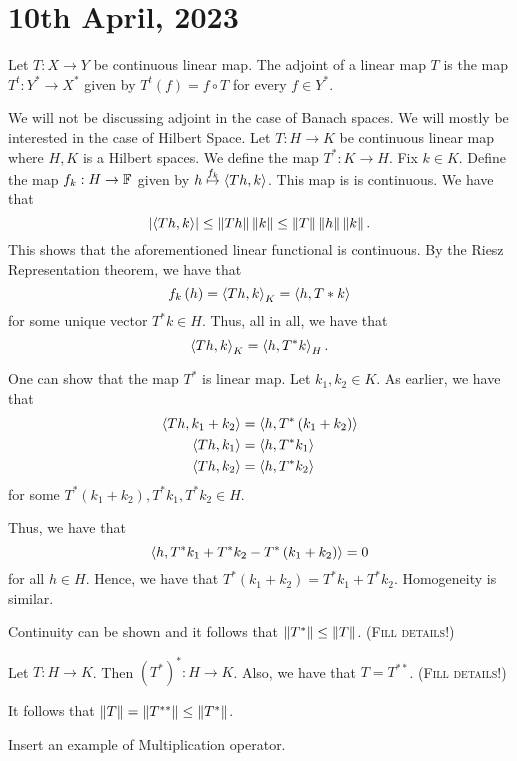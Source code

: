 \section{10th April, 2023}
\horz
Let $T: X\to Y$ be continuous linear map. The adjoint of a linear map $T$ is the map $T^{t} : Y^{*} \to X^{*}$ given by $T^{t} (f) = f \circ T$ for every $f \in Y^{*}$.

We will not be discussing adjoint in the case of Banach spaces. We will mostly be interested in the case of Hilbert Space. Let $T: H \to K$ be continuous linear map where $H, K$ is a Hilbert spaces. We define the map $T^{*} : K \to H$. Fix $k \in K$. Define the map $f_{k} : H \to \mathbb F$ given by $h \stackrel{f_{k}}{\mapsto} \left\langle Th, k \right\rangle$. This map is is continuous. We have that
\begin{equation*}
    \left\lvert \left\langle Th, k \right\rangle \right\rvert \le \left\lVert Th \right\rVert \left\lVert k \right\rVert \le \left\lVert T \right\rVert \left\lVert h \right\rVert \left\lVert k \right\rVert.
\end{equation*}
This shows that the aforementioned linear functional is continuous. By the Riesz Representation theorem, we have that 
\begin{equation*}
    f_{k} \left( h \right) = \left\langle Th, k \right\rangle_{K} = \left\langle h, T*k \right\rangle
\end{equation*}
for some unique vector $T^{*} k \in H$.
Thus, all in all, we have that 
\begin{equation*}
    \left\langle Th, k \right\rangle_{K} = \left\langle h, T^{*}k \right\rangle_{H}.
\end{equation*}

One can show that the map $T^{*}$ is linear map. Let $k_1 , k_{2} \in K$. As earlier, we have that
\begin{align*}
    \left\langle Th, k_{1} + k_{2} \right\rangle &= \left\langle h, T^{*} \left( k_{1} + k_{2} \right)  \right\rangle \\
    \left\langle Th, k_{1} \right\rangle &=  \left\langle h, T^{*}k_{1} \right\rangle \\
    \left\langle Th, k_{2} \right\rangle &=  \left\langle h, T^{*}k_{2} \right\rangle
\end{align*}
for some $T^{*}\left( k_{1} + k_{2} \right) , T^{*}k_{1} , T^{*} k_{2} \in H$. 

Thus, we have that
\begin{equation*}
    \left\langle h, T^{*} k_{1} + T^{*} k_{2} - T^{*} \left( k_{1} + k_{2} \right) \right\rangle = 0
\end{equation*}
for all $h \in H$.
Hence, we have that $T^{*} \left( k_{1} + k_{2} \right) = T^{*} k_{1} + T^{*} k_{2}$. Homogeneity is similar.

Continuity can be shown and it follows that $\left\lVert T^{*} \right\rVert \le \left\lVert T \right\rVert$. (\textsc{Fill details!})

Let $T: H \to K$. Then $(T^{*})^{*} : H \to K$. Also, we have that $T=T^{**}$. (\textsc{Fill details!})

It follows that $\left\lVert T \right\rVert = \left\lVert T^{**} \right\rVert \le \left\lVert T^{*} \right\rVert$.

Insert an example of Multiplication operator.
